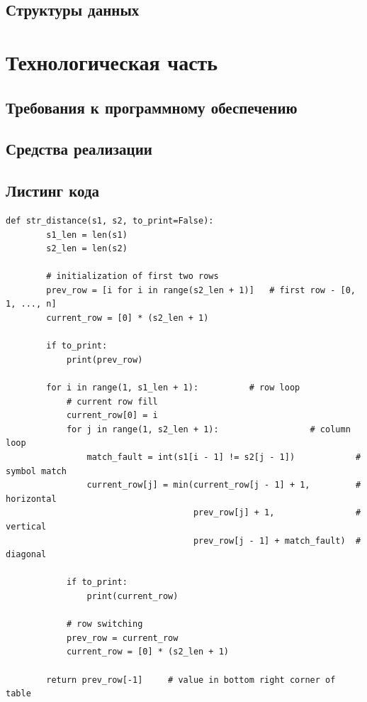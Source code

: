 \documentclass[12pt]{report}
\begin{document}
	

	\section{Структуры данных}
	
	\chapter{Технологическая часть}
	\section{Требования к программному обеспечению}
	\section{Средства реализации}
   \section{Листинг кода}
	\begin{lstlisting}[label=some-code,caption=Расстояние Левенштейна (матрично)]
	def str_distance(s1, s2, to_print=False):
	    s1_len = len(s1)
	    s2_len = len(s2)
	
	    # initialization of first two rows
	    prev_row = [i for i in range(s2_len + 1)]   # first row - [0, 1, ..., n]
	    current_row = [0] * (s2_len + 1)
	
	    if to_print:
	        print(prev_row)
	
	    for i in range(1, s1_len + 1):          # row loop
	        # current row fill
	        current_row[0] = i
	        for j in range(1, s2_len + 1):                  # column loop
	            match_fault = int(s1[i - 1] != s2[j - 1])            # symbol match
	            current_row[j] = min(current_row[j - 1] + 1,         # horizontal
	                                 prev_row[j] + 1,                # vertical
	                                 prev_row[j - 1] + match_fault)  # diagonal
	
	        if to_print:
	            print(current_row)
	
	        # row switching
	        prev_row = current_row
	        current_row = [0] * (s2_len + 1)
	
	    return prev_row[-1]     # value in bottom right corner of table
	\end{lstlisting}
\end{document}
